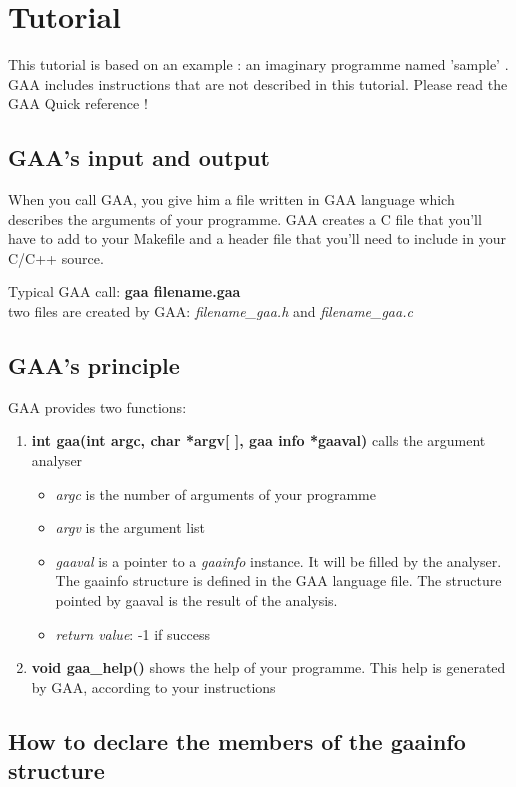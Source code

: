 \chapter{Tutorial}

\par
This tutorial is based on an example : an imaginary programme named
'sample' . GAA includes instructions that are not described in this tutorial.
Please read the GAA Quick reference !


\section{GAA's input and output}
 When you call GAA, you give him a file written in
GAA language which describes the arguments of your programme. GAA
creates a C file that you'll have to add to your Makefile and a header
file that you'll need to include in your C/C++ source.

\par
Typical GAA call:
{\bf gaa filename.gaa} \\
two files are created by GAA: {\it filename\_gaa.h} and {\it filename\_gaa.c}

\section{GAA's principle}
GAA provides two functions:
\begin{enumerate}
 \item {\bf int gaa(int argc, char *argv[ ], gaa info *gaaval)} calls
 the argument analyser
 \begin{itemize}
  \item {\it argc} is the number of arguments of your programme
  \item {\it argv} is the argument list
  \item {\it gaaval} is a pointer to a {\it gaainfo} instance. It will be
filled by the analyser. The gaainfo structure is defined in the
GAA language file. The structure pointed by gaaval is the result
of the analysis.
  \item {\it return value}: -1 if success
 \end{itemize}
 \item {\bf void gaa\_help()} shows the help of your programme. This help is
generated by GAA, according to your instructions
\end{enumerate}

\section{How to declare the members of the gaainfo structure}

